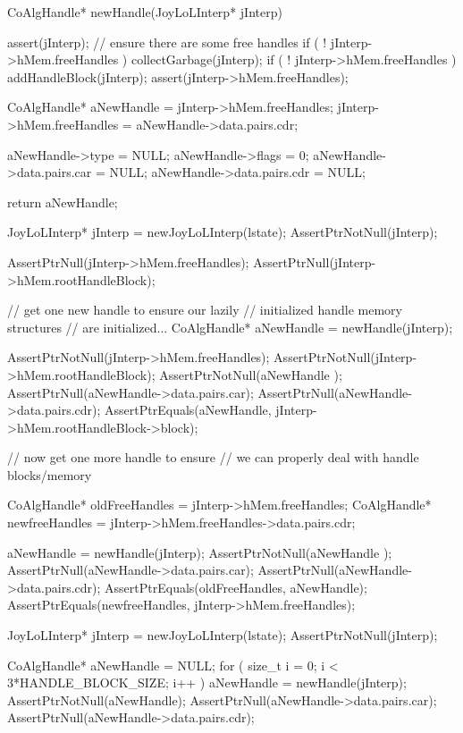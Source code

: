 \startCCode
CoAlgHandle* newHandle(JoyLoLInterp* jInterp) {
  assert(jInterp);
  // ensure there are some free handles
  if ( ! jInterp->hMem.freeHandles ) collectGarbage(jInterp);
  if ( ! jInterp->hMem.freeHandles ) addHandleBlock(jInterp);
  assert(jInterp->hMem.freeHandles);

  CoAlgHandle* aNewHandle   = jInterp->hMem.freeHandles;
  jInterp->hMem.freeHandles = aNewHandle->data.pairs.cdr;

  aNewHandle->type        = NULL;
  aNewHandle->flags       = 0;
  aNewHandle->data.pairs.car = NULL;
  aNewHandle->data.pairs.cdr = NULL;

  return aNewHandle;
}
\stopCCode

\startCTest
  JoyLoLInterp* jInterp = newJoyLoLInterp(lstate);
  AssertPtrNotNull(jInterp);

  AssertPtrNull(jInterp->hMem.freeHandles);
  AssertPtrNull(jInterp->hMem.rootHandleBlock);

  // get one new handle to ensure our lazily
  // initialized handle memory structures 
  // are initialized...
  CoAlgHandle* aNewHandle = newHandle(jInterp);

  AssertPtrNotNull(jInterp->hMem.freeHandles);
  AssertPtrNotNull(jInterp->hMem.rootHandleBlock);
  AssertPtrNotNull(aNewHandle );
  AssertPtrNull(aNewHandle->data.pairs.car);
  AssertPtrNull(aNewHandle->data.pairs.cdr);
  AssertPtrEquals(aNewHandle,
    jInterp->hMem.rootHandleBlock->block);

  // now get one more handle to ensure
  // we can properly deal with handle blocks/memory
  
  CoAlgHandle* oldFreeHandles =
    jInterp->hMem.freeHandles;
  CoAlgHandle* newfreeHandles = 
    jInterp->hMem.freeHandles->data.pairs.cdr;

  aNewHandle = newHandle(jInterp);
  AssertPtrNotNull(aNewHandle );
  AssertPtrNull(aNewHandle->data.pairs.car);
  AssertPtrNull(aNewHandle->data.pairs.cdr);
  AssertPtrEquals(oldFreeHandles, aNewHandle);
  AssertPtrEquals(newfreeHandles, jInterp->hMem.freeHandles);
\stopCTest
\stopTestCase


\startCTest
  JoyLoLInterp* jInterp = newJoyLoLInterp(lstate);
  AssertPtrNotNull(jInterp);

  CoAlgHandle* aNewHandle = NULL;
  for ( size_t i = 0; i < 3*HANDLE_BLOCK_SIZE; i++ ) {
    aNewHandle = newHandle(jInterp);
  }
  AssertPtrNotNull(aNewHandle);
  AssertPtrNull(aNewHandle->data.pairs.car);
  AssertPtrNull(aNewHandle->data.pairs.cdr);
\stopCTest
\stopTestCase
\stopTestSuite

